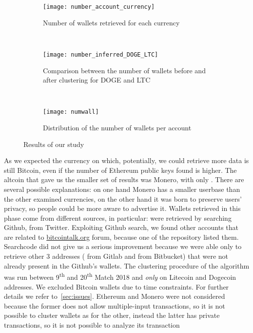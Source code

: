 \begin{figure*}
\centering
\begin{subfigure}[t]{0.3\textwidth}
\centering
\texttt{[image: number\_account\_currency]}
\caption{Number of wallets retrieved for each currency}
\label{fig:numberaccountcurrency}
\end{subfigure}
~
\begin{subfigure}[t]{0.3\textwidth}
\texttt{[image: number\_inferred\_DOGE\_LTC]}
\caption{Comparison between the number of wallets before and after clustering
for DOGE and LTC}
\label{fig:dogeltcclustered}
\end{subfigure}
~
\begin{subfigure}[t]{0.3\textwidth}
\centering
\texttt{[image: numwall]}
\caption{Distribution of the number of wallets per account}
\label{fig:numwall}
\end{subfigure}
\caption{Results of our study}
\end{figure*}
As we expected the currency on which, potentially, we could retrieve more data
is still Bitcoin, even if the number of Ethereum public keys found is higher.
The altcoin that gave us the smaller set of results was Monero, with only
\startingXMR{}. There are several possible explanations: on one hand Monero has
a smaller userbase than the other examined currencies, on the other hand it was
born to preserve users' privacy, so people could be more aware to advertise it.
Wallets retrieved in this phase come from different sources, in particular:
\accountGithub{} were retrieved by searching Github, \accountTwitter{}
from Twitter. Exploiting Github search, we found other \accountBitcointalk{}
accounts that are related to \url{bitcointalk.org} forum, because one
of the repository listed them. Searchcode did not give us a serious improvement
because we were able only to retrieve other 3 addresses (\accountGitlab{} from
Gitlab and \accountBitbucket{} from Bitbucket) that were not already present in
the Github's wallets.
The clustering procedure of the algorithm was run between 9\textsuperscript{th}
and 20\textsuperscript{th} Match 2018 and \emph{only} on Litecoin and Dogecoin
addresses. We excluded Bitcoin wallets due to time constraints.
For further details we refer to~\autoref{sec:issues}. Ethereum and Monero were
not considered because the former does not allow multiple-input transactions,
so it is not possible to cluster wallets as for the other, instead the latter
has private transactions, so it is not possible to analyze its transaction
